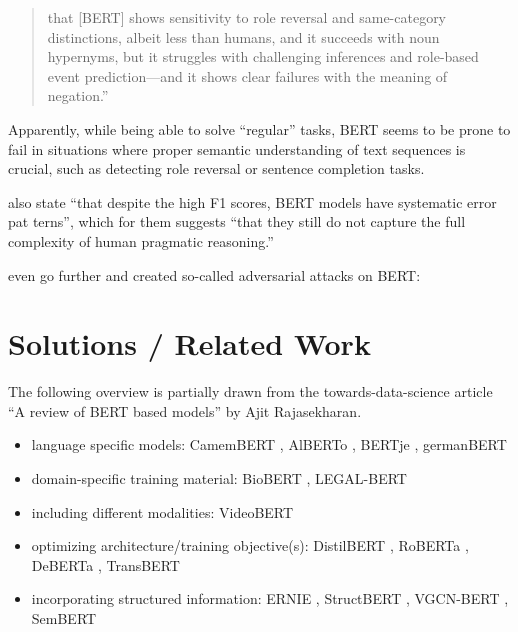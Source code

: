 \begin{quote}
that [BERT] shows sensitivity to role reversal and
same-category distinctions, albeit less than humans, and it succeeds with noun hypernyms,
but it struggles with challenging inferences and role-based event prediction—and it shows
clear failures with the meaning of negation.'' \citep[p.~46]{ettinger2020bert}
\end{quote}

Apparently, while being able to solve ``regular'' tasks, BERT seems to be prone to fail
in situations where proper semantic understanding of text sequences is crucial, such as
detecting role reversal or sentence completion tasks.

\cite{jiang2019evaluating} also state ``that despite the high F1 scores, BERT models have
systematic error pat terns'', which for them suggests ``that they still do not capture the
full complexity of human pragmatic reasoning.''


\cite{jin2020bert}even go further and created so-called adversarial attacks on BERT:




\section{Solutions / Related Work}



The following overview is partially drawn from the towards-data-science article ``A review of BERT based models'' by Ajit Rajasekharan.

\begin{itemize}
  \item language specific models: CamemBERT \cite{martin2019camembert}, AlBERTo \cite{polignano2019alberto}, BERTje \cite{de2019bertje}, germanBERT
  \item domain-specific training material: BioBERT \cite{lee2020biobert}, LEGAL-BERT \cite{chalkidis2020legalbert}
  \item including different modalities:  VideoBERT \cite{sun2019videobert}
  \item optimizing architecture/training objective(s): DistilBERT \cite{sanh2019distilbert}, RoBERTa \cite{liu2019roberta}, DeBERTa \cite{he2020deberta}, TransBERT \cite{li2021transbert}
  \item incorporating structured information: ERNIE \cite{sun2019ernie}, StructBERT \cite{wang2019structbert}, VGCN-BERT \cite{lu2020vgcn}, SemBERT \cite{zhang2019semantics}
\end{itemize}

